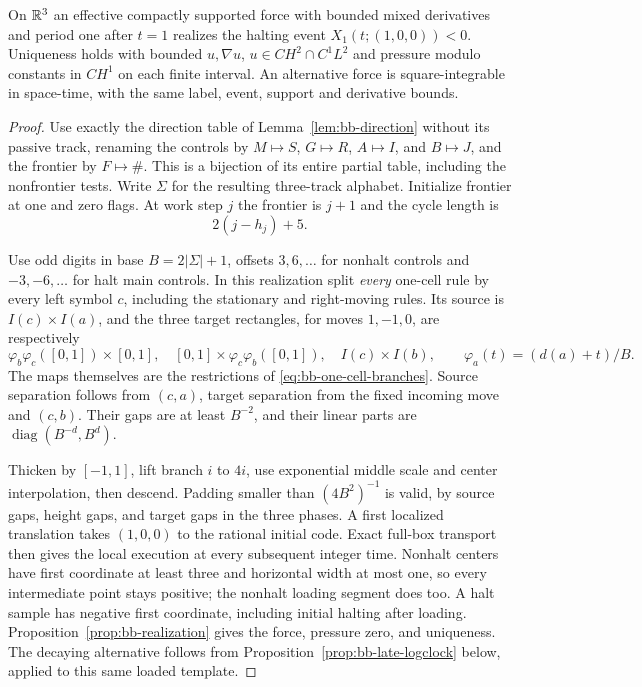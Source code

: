 \begin{theorem}\label{thm:bb-direction-shuttle}
On $\mathbb R^3$ an effective compactly supported force with bounded mixed
derivatives and period one after $t=1$ realizes the halting event
$X_1(t;(1,0,0))<0$.  Uniqueness holds with bounded $u,\nabla u$,
$u\in C H^2\cap C^1L^2$ and pressure modulo constants in $C H^1$
on each finite interval.  An alternative force is square-integrable
in space-time, with the same label, event, support and derivative
bounds.
\end{theorem}
\begin{proof}\label{proof:bb-direction-shuttle}
Use exactly the direction table of Lemma~\ref{lem:bb-direction}
without its passive track, renaming
the controls by $M\mapsto S$, $G\mapsto R$, $A\mapsto I$,
and $B\mapsto J$, and the frontier by $F\mapsto\#$.  This is a bijection
of its entire partial table, including the nonfrontier tests.
Write $\Sigma$ for the resulting three-track alphabet.
Initialize frontier at one and zero flags.  At work step $j$ the
frontier is $j+1$ and the cycle length is
\[2(j-h_j)+5.\]

Use odd digits in base $B=2|\Sigma|+1$, offsets $3,6,\ldots$
for nonhalt controls and $-3,-6,\ldots$ for halt main controls.
In this realization split \emph{every} one-cell rule by every left
symbol $c$, including the stationary and right-moving rules.
Its source is $I(c)\times I(a)$, and the three target rectangles,
for moves $1,-1,0$, are respectively
\[
 \varphi_b\varphi_c([0,1])\times[0,1],\quad
 [0,1]\times\varphi_c\varphi_b([0,1]),\quad I(c)\times I(b),
 \qquad \varphi_a(t)=(d(a)+t)/B.
\]
The maps themselves are the restrictions of
\eqref{eq:bb-one-cell-branches}.  Source separation follows from
$(c,a)$, target separation from the fixed incoming move and $(c,b)$.
Their gaps are at least $B^{-2}$, and their linear parts are
$\operatorname{diag}(B^{-d},B^d)$.

Thicken by $[-1,1]$, lift branch $i$ to $4i$, use exponential
middle scale and center interpolation, then descend.  Padding smaller
than $(4B^2)^{-1}$ is valid, by source gaps, height gaps, and target
gaps in the three phases.  A first localized translation takes
$(1,0,0)$ to the rational initial code.  Exact full-box transport
then gives the local execution at every subsequent integer time.
Nonhalt centers have first coordinate at least three and horizontal
width at most one, so every intermediate point stays positive;
the nonhalt loading segment does too.  A halt sample has negative
first coordinate, including initial halting after loading.
Proposition~\ref{prop:bb-realization} gives the force, pressure zero,
and uniqueness.  The decaying alternative follows from
Proposition~\ref{prop:bb-late-logclock} below, applied to this same
loaded template.
\end{proof}

